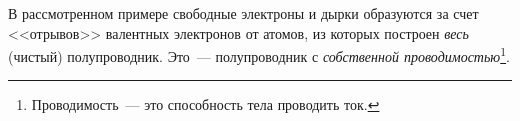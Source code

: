 \documentclass[main.tex]{subfiles}
\begin{document}
\begin{NoHyper}
В рассмотренном примере свободные электроны и дырки образуются за счет <<отрывов>> валентных электронов от атомов, из которых построен \emph{весь} (чистый) полупроводник.
Это~--- полупроводник с \emph{собственной проводимостью}\footnote{Проводимость~--- это способность тела проводить ток.}.


















\end{NoHyper}
\end{document}
